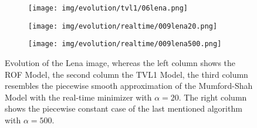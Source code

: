 \begin{figure}[ht]
\begin{center}
\begin{subfigure}[b]{0.19\textwidth}
            \texttt{[image: img/evolution/tvl1/06lena.png]}
        \end{subfigure}
        \begin{subfigure}[b]{0.19\textwidth}
            \texttt{[image: img/evolution/realtime/009lena20.png]}
        \end{subfigure}
        \begin{subfigure}[b]{0.19\textwidth}
            \texttt{[image: img/evolution/realtime/009lena500.png]}
        \end{subfigure}
    \end{center}
    \caption{Evolution of the Lena image, whereas the left column shows the ROF Model, the second column the TVL1 Model, the third column resembles the piecewise smooth approximation of the Mumford-Shah Model with the real-time minimizer with $\alpha = 20$. The right column shows the piecewise constant case of the last mentioned algorithm with $\alpha = 500$.}
\end{figure}

